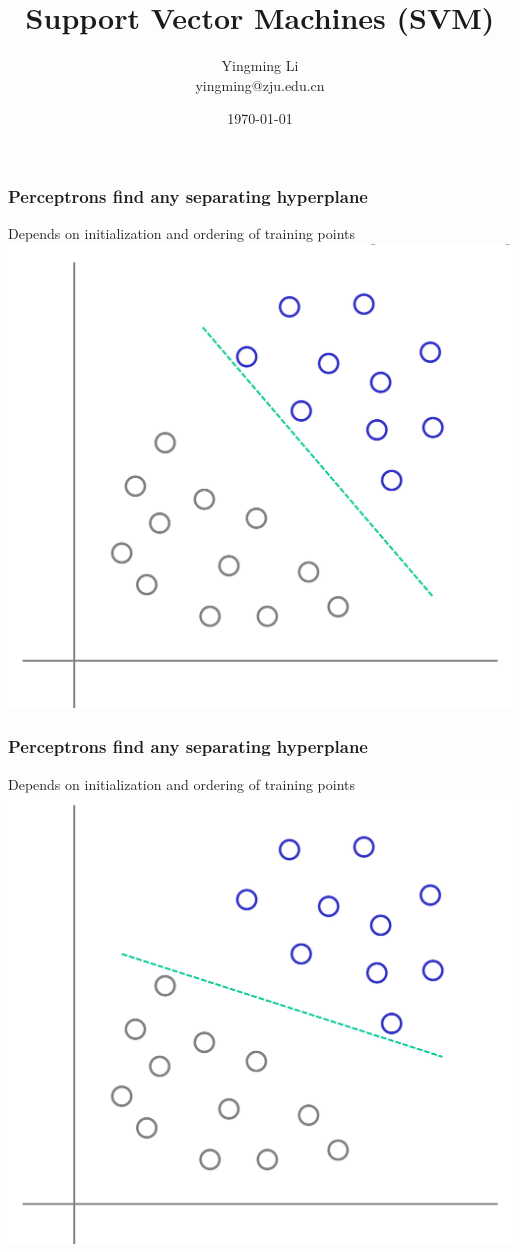 \documentclass[12pt,notes,mathserif]{beamer}
\title{Support Vector Machines (SVM)}
\author[YingmingLi]{Yingming Li \\ yingming@zju.edu.cn}
\institute[DSERC, ZJU]{Data Science \& Engineering Research Center, ZJU}
\date[\today]{\today}
\begin{document}

\begin{frame}[c]
	\titlepage
\end{frame}

\begin{frame}[c]
	\frametitle{Perceptrons find any separating hyperplane}
	\begin{center}
		Depends on initialization and ordering of training points\\
		\includegraphics[width=0.7\linewidth]{fig8/lec82.jpg}
	\end{center}
\end{frame}
\begin{frame}[c]
	\frametitle{Perceptrons find any separating hyperplane}
	\begin{center}
		Depends on initialization and ordering of training points\\
		\includegraphics[width=0.7\linewidth]{fig8/lec83.jpg}
	\end{center}
\end{frame}
\end{document}

